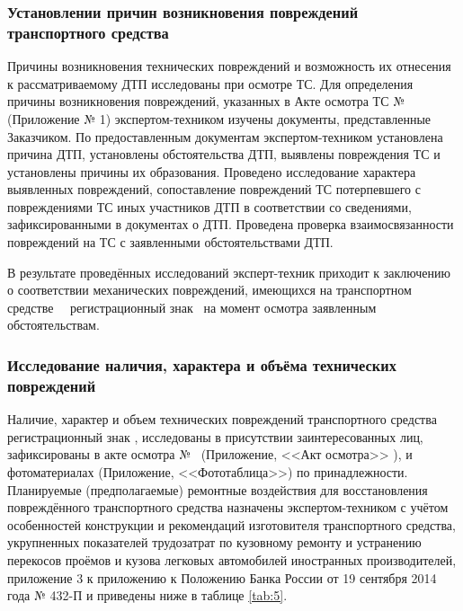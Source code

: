 \subsubsection{Установлении причин возникновения повреждений транспортного средства}
%    
    
    Причины возникновения технических повреждений и возможность их отнесения к
рассматриваемому ДТП исследованы при осмотре ТС. Для определения причины возникновения повреждений, указанных в Акте осмотра ТС  №  \NomerDoc\, (Приложение № 1) экспертом-техником изучены документы, представленные Заказчиком. По предоставленным документам экспертом-техником установлена причина ДТП, установлены обстоятельства ДТП, выявлены повреждения ТС и установлены причины их образования. Проведено исследование характера выявленных повреждений, сопоставление повреждений ТС потерпевшего с повреждениями ТС иных участников ДТП в соответствии со сведениями, зафиксированными в документах о ДТП.  Проведена проверка взаимосвязанности повреждений на ТС с заявленными обстоятельствами ДТП. 

В результате проведённых исследований эксперт-техник приходит к заключению о соответствии механических повреждений, имеющихся на транспортном средстве \, \, регистрационный знак \, на момент осмотра заявленным обстоятельствам. 


\subsubsection{Исследование наличия, характера и объёма технических повреждений}

  Наличие, характер и объем технических повреждений транспортного средства \tc\, регистрационный знак \grz, исследованы в присутствии заинтересованных лиц,  зафиксированы в акте осмотра № \NomerDoc\,  (Приложение, <<Акт осмотра>> ),  и фотоматериалах (Приложение, <<Фототаблица>>) по принадлежности. Планируемые (предполагаемые) ремонтные воздействия для восстановления повреждённого  транспортного средства назначены экспертом-техником с учётом особенностей конструкции и рекомендаций изготовителя  транспортного средства, укрупненных показателей трудозатрат по кузовному ремонту и устранению перекосов проёмов и кузова легковых автомобилей иностранных производителей, приложение 3 к приложению к Положению Банка России от 19 сентября 2014 года № 432-П и приведены ниже в таблице \ref{tab:5}.
 
